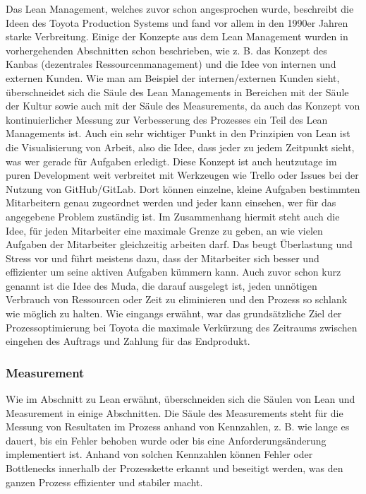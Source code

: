 Das Lean Management, welches zuvor schon angesprochen wurde, beschreibt die Ideen des Toyota Production Systems und fand vor allem in den 1990er Jahren starke Verbreitung. Einige der Konzepte aus dem Lean Management wurden in vorhergehenden Abschnitten schon beschrieben, wie z. B. das Konzept des Kanbas (dezentrales Ressourcenmanagement) und die Idee von internen und externen Kunden. Wie man am Beispiel der internen/externen Kunden sieht, überschneidet sich die Säule des Lean Managements in Bereichen mit der Säule der Kultur sowie auch mit der Säule des Measurements, da auch das Konzept von kontinuierlicher Messung zur Verbesserung des Prozesses ein Teil des Lean Managements ist. Auch ein sehr wichtiger Punkt in den Prinzipien von Lean ist die Visualisierung von Arbeit, also die Idee, dass jeder zu jedem Zeitpunkt sieht, was wer gerade für Aufgaben erledigt. Diese Konzept ist auch heutzutage im puren Development weit verbreitet mit Werkzeugen wie Trello oder Issues bei der Nutzung von GitHub/GitLab. Dort können einzelne, kleine Aufgaben bestimmten Mitarbeitern genau zugeordnet werden und jeder kann einsehen, wer für das angegebene Problem zuständig ist. Im Zusammenhang hiermit steht auch die Idee, für jeden Mitarbeiter eine maximale Grenze zu geben, an wie vielen Aufgaben der Mitarbeiter gleichzeitig arbeiten darf. Das beugt Überlastung und Stress vor und führt meistens dazu, dass der Mitarbeiter sich besser und effizienter um seine aktiven Aufgaben kümmern kann. Auch zuvor schon kurz genannt ist die Idee des \glqq Muda\grqq , die darauf ausgelegt ist, jeden unnötigen Verbrauch von Ressourcen oder Zeit zu eliminieren und den Prozess so schlank wie möglich zu halten. Wie eingangs erwähnt, war das grundsätzliche Ziel der Prozessoptimierung bei Toyota die maximale Verkürzung des Zeitraums zwischen eingehen des Auftrags und Zahlung für das Endprodukt.

\subsubsection*{Measurement}

Wie im Abschnitt zu Lean erwähnt, überschneiden sich die Säulen von Lean und Measurement in einige Abschnitten. Die Säule des Measurements steht für die Messung von Resultaten im Prozess anhand von Kennzahlen, z. B. wie lange es dauert, bis ein Fehler behoben wurde oder bis eine Anforderungsänderung implementiert ist. Anhand von solchen Kennzahlen können Fehler oder Bottlenecks innerhalb der Prozesskette erkannt und beseitigt werden, was den ganzen Prozess effizienter und stabiler macht.

